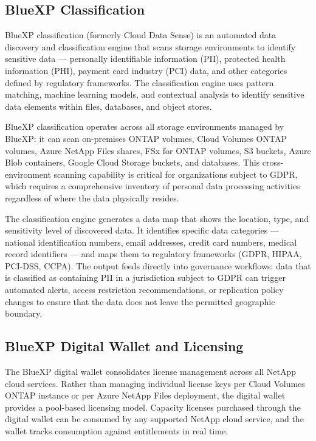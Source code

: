 \subsection{BlueXP Classification}

BlueXP classification (formerly Cloud Data Sense) is an automated data discovery and classification engine that scans storage environments to identify sensitive data --- personally identifiable information (PII), protected health information (PHI), payment card industry (PCI) data, and other categories defined by regulatory frameworks. The classification engine uses pattern matching, machine learning models, and contextual analysis to identify sensitive data elements within files, databases, and object stores.

BlueXP classification operates across all storage environments managed by BlueXP: it can scan on-premises ONTAP volumes, Cloud Volumes ONTAP volumes, Azure NetApp Files shares, FSx for ONTAP volumes, S3 buckets, Azure Blob containers, Google Cloud Storage buckets, and databases. This cross-environment scanning capability is critical for organizations subject to GDPR, which requires a comprehensive inventory of personal data processing activities regardless of where the data physically resides.

The classification engine generates a data map that shows the location, type, and sensitivity level of discovered data. It identifies specific data categories --- national identification numbers, email addresses, credit card numbers, medical record identifiers --- and maps them to regulatory frameworks (GDPR, HIPAA, PCI-DSS, CCPA). The output feeds directly into governance workflows: data that is classified as containing PII in a jurisdiction subject to GDPR can trigger automated alerts, access restriction recommendations, or replication policy changes to ensure that the data does not leave the permitted geographic boundary.

\subsection{BlueXP Digital Wallet and Licensing}

The BlueXP digital wallet consolidates license management across all NetApp cloud services. Rather than managing individual license keys per Cloud Volumes ONTAP instance or per Azure NetApp Files deployment, the digital wallet provides a pool-based licensing model. Capacity licenses purchased through the digital wallet can be consumed by any supported NetApp cloud service, and the wallet tracks consumption against entitlements in real time.

